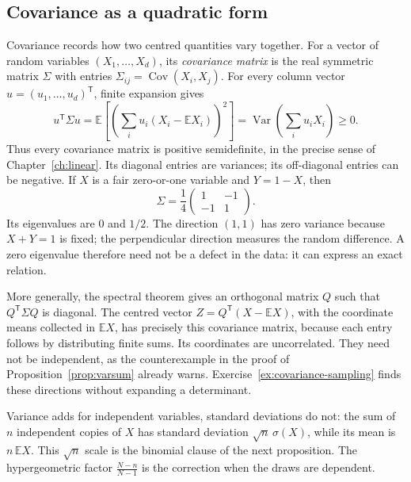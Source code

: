\subsection{Covariance as a quadratic form}
Covariance records how two centred quantities vary together. For a vector of
random variables $(X_1,\ldots,X_d)$, its \emph{covariance matrix} is the real
symmetric matrix $\Sigma$ with entries
$\Sigma_{ij}=\operatorname{Cov}(X_i,X_j)$. For every column vector
$u=(u_1,\ldots,u_d)^{\mathsf T}$, finite expansion gives
\[
 u^{\mathsf T}\Sigma u
 =\mathbb E\left[\left(\sum_i u_i(X_i-\mathbb EX_i)\right)^2\right]
 =\operatorname{Var}\left(\sum_i u_iX_i\right)\ge0.
\]
Thus every covariance matrix is positive semidefinite, in the precise sense of
Chapter~\ref{ch:linear}. Its diagonal entries are variances; its off-diagonal
entries can be negative. If $X$ is a fair zero-or-one variable and $Y=1-X$,
then
\[
 \Sigma=\frac14\begin{pmatrix}1&-1\\-1&1\end{pmatrix}.
\]
Its eigenvalues are $0$ and $1/2$. The direction $(1,1)$ has zero variance
because $X+Y=1$ is fixed; the perpendicular direction measures the random
difference. A zero eigenvalue therefore need not be a defect in the data:
it can express an exact relation.

More generally, the spectral theorem gives an orthogonal matrix $Q$ such that
$Q^{\mathsf T}\Sigma Q$ is diagonal. The centred vector
$Z=Q^{\mathsf T}(X-\mathbb EX)$, with the coordinate means collected in $\mathbb EX$, has precisely this covariance matrix,
because each entry follows by distributing finite sums. Its coordinates are
uncorrelated. They need not be independent, as the counterexample in the proof of
Proposition~\ref{prop:varsum} already warns. Exercise~\ref{ex:covariance-sampling}
finds these directions without expanding a determinant.

Variance adds for independent variables, standard deviations do not: the sum of $n$ independent copies of $X$ has standard deviation $\sqrt n\,\sigma(X)$, while its mean is $n\,\mathbb E X$. This $\sqrt n$ scale is the binomial clause of the next proposition. The hypergeometric factor $\frac{N-n}{N-1}$ is the correction when the draws are dependent.

